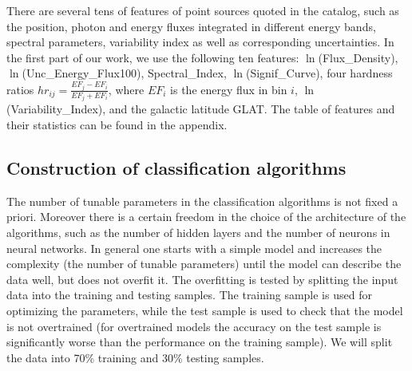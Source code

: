 There are several tens of features of point sources quoted in the catalog, such as the position, photon and energy fluxes integrated in different energy bands, spectral parameters, variability index as well as corresponding uncertainties.
In the first part of our work, we use the following ten features:
$\ln$(Flux\_Density), $\ln$(Unc\_Energy\_Flux100), Spectral\_Index, $\ln$(Signif\_Curve), 
four hardness ratios $hr_{ij} = \frac{EF_j - EF_i}{EF_j + EF_i}$, where $EF_i$ is the energy flux in bin $i$, $\ln$(Variability\_Index), and the galactic latitude GLAT.
The table of features and their statistics can be found in the appendix.

\subsection{Construction of classification algorithms}

The number of tunable parameters in the classification algorithms is not fixed a priori. 
Moreover there is a certain freedom in the choice of the architecture of the algorithms, such as
the number of hidden layers and the number of neurons in neural networks.
In general one starts with a simple model and increases the complexity (the number of tunable parameters)
until the model can describe the data well, but does not overfit it.
The overfitting is tested by splitting the input data into the training and testing samples.
The training sample is used for optimizing the parameters,
while the test sample is used to check that the model is not overtrained (for overtrained models the accuracy on the test
sample is significantly worse than the performance on the training sample).
We will split the data into 70\% training and 30\% testing samples.

